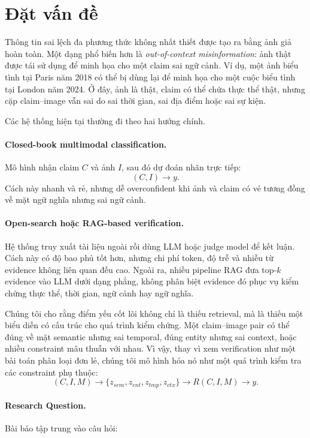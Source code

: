 \documentclass[11pt,a4paper]{article}
\begin{document}
\section{Đặt vấn đề}

Thông tin sai lệch đa phương thức không nhất thiết được tạo ra bằng ảnh giả hoàn toàn. Một dạng phổ biến hơn là \textit{out-of-context misinformation}: ảnh thật được tái sử dụng để minh họa cho một claim sai ngữ cảnh. Ví dụ, một ảnh biểu tình tại Paris năm 2018 có thể bị dùng lại để minh họa cho một cuộc biểu tình tại London năm 2024. Ở đây, ảnh là thật, claim có thể chứa thực thể thật, nhưng cặp claim--image vẫn sai do sai thời gian, sai địa điểm hoặc sai sự kiện.

Các hệ thống hiện tại thường đi theo hai hướng chính.

\paragraph{Closed-book multimodal classification.}
Mô hình nhận claim $C$ và ảnh $I$, sau đó dự đoán nhãn trực tiếp:
\[
(C,I) \rightarrow y.
\]
Cách này nhanh và rẻ, nhưng dễ overconfident khi ảnh và claim có vẻ tương đồng về mặt ngữ nghĩa nhưng sai ngữ cảnh.

\paragraph{Open-search hoặc RAG-based verification.}
Hệ thống truy xuất tài liệu ngoài rồi dùng LLM hoặc judge model để kết luận. Cách này có độ bao phủ tốt hơn, nhưng chi phí token, độ trễ và nhiễu từ evidence không liên quan đều cao. Ngoài ra, nhiều pipeline RAG đưa top-$k$ evidence vào LLM dưới dạng phẳng, không phân biệt evidence đó phục vụ kiểm chứng thực thể, thời gian, ngữ cảnh hay ngữ nghĩa.

Chúng tôi cho rằng điểm yếu cốt lõi không chỉ là thiếu retrieval, mà là thiếu một biểu diễn có cấu trúc cho quá trình kiểm chứng. Một claim--image pair có thể đúng về mặt semantic nhưng sai temporal, đúng entity nhưng sai context, hoặc nhiều constraint mâu thuẫn với nhau. Vì vậy, thay vì xem verification như một bài toán phân loại đơn lẻ, chúng tôi mô hình hóa nó như một quá trình kiểm tra các constraint phụ thuộc:
\[
(C,I,M) \rightarrow \{z_{sem}, z_{ent}, z_{tmp}, z_{ctx}\} \rightarrow R(C,I,M) \rightarrow y.
\]

\paragraph{Research Question.}
Bài báo tập trung vào câu hỏi:
\end{document}
